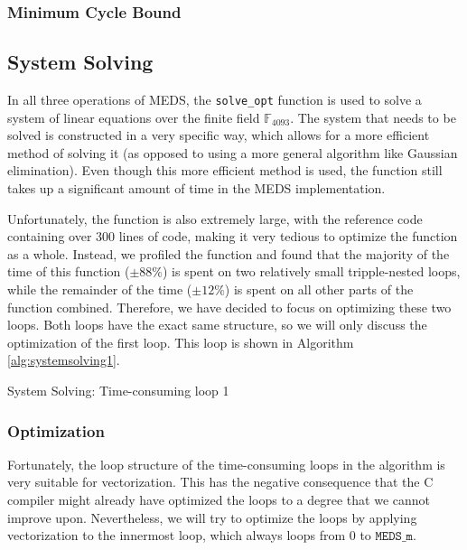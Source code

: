 \documentclass[11pt,a4paper]{report}
\theoremstyle{definition}
\begin{document}
\subsubsection{Minimum Cycle Bound}

\subsection{System Solving}
\label{sec:systemsolving}
In all three operations of MEDS, the \texttt{solve\_opt} function is used to solve a system of linear equations over the finite field $\mathbb{F}_{4093}$. The system that needs to be solved is constructed in a very specific way, which allows for a more efficient method of solving it (as opposed to using a more general algorithm like Gaussian elimination). Even though this more efficient method is used, the function still takes up a significant amount of time in the MEDS implementation.

Unfortunately, the function is also extremely large, with the reference code containing over 300 lines of code, making it very tedious to optimize the function as a whole. Instead, we profiled the function and found that the majority of the time of this function ($\pm 88 \%$) is spent on two relatively small tripple-nested loops, while the remainder of the time ($\pm 12 \%$) is spent on all other parts of the function combined. Therefore, we have decided to focus on optimizing these two loops. Both loops have the exact same structure, so we will only discuss the optimization of the first loop. This loop is shown in Algorithm \ref{alg:systemsolving1}.

\begin{algorithm}
  \caption{System Solving: Time-consuming loop 1}
  \label{alg:systemsolving1}
  
\end{algorithm}

\subsubsection{Optimization}
\label{sec:systemsolvingoptimization}
Fortunately, the loop structure of the time-consuming loops in the algorithm is very suitable for vectorization. This has the negative consequence that the C compiler might already have optimized the loops to a degree that we cannot improve upon. Nevertheless, we will try to optimize the loops by applying vectorization to the innermost loop, which always loops from $0$ to $\texttt{MEDS\_m}$.
\end{document}
